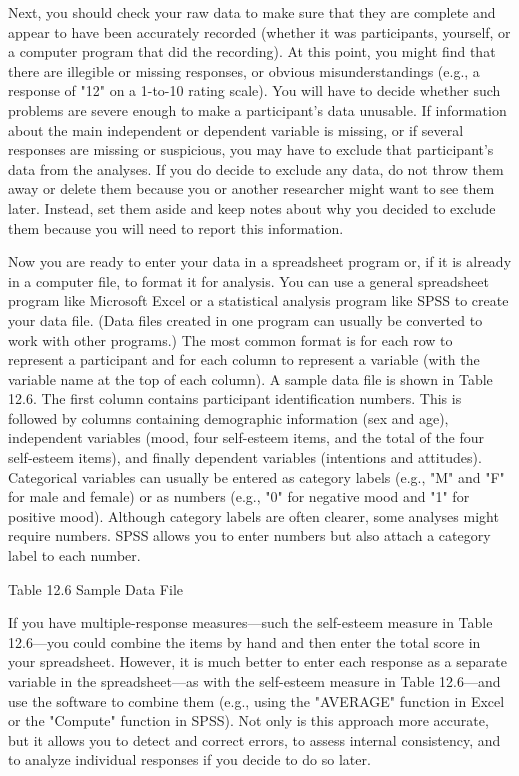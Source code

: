 Next, you should check your raw data to make sure that they are complete and appear to have been accurately recorded (whether it was participants, yourself, or a computer program that did the recording). At this point, you might find that there are illegible or missing responses, or obvious misunderstandings (e.g., a response of "12" on a 1-to-10 rating scale). You will have to decide whether such problems are severe enough to make a participant's data unusable. If information about the main independent or dependent variable is missing, or if several responses are missing or suspicious, you may have to exclude that participant's data from the analyses. If you do decide to exclude any data, do not throw them away or delete them because you or another researcher might want to see them later. Instead, set them aside and keep notes about why you decided to exclude them because you will need to report this information.

Now you are ready to enter your data in a spreadsheet program or, if it is already in a computer file, to format it for analysis. You can use a general spreadsheet program like Microsoft Excel or a statistical analysis program like SPSS to create your data file. (Data files created in one program can usually be converted to work with other programs.) The most common format is for each row to represent a participant and for each column to represent a variable (with the variable name at the top of each column). A sample data file is shown in Table 12.6. The first column contains participant identification numbers. This is followed by columns containing demographic information (sex and age), independent variables (mood, four self-esteem items, and the total of the four self-esteem items), and finally dependent variables (intentions and attitudes). Categorical variables can usually be entered as category labels (e.g., "M" and "F" for male and female) or as numbers (e.g., "0" for negative mood and "1" for positive mood). Although category labels are often clearer, some analyses might require numbers. SPSS allows you to enter numbers but also attach a category label to each number.

Table 12.6 Sample Data File

If you have multiple-response measures---such the self-esteem measure in Table 12.6---you could combine the items by hand and then enter the total score in your spreadsheet. However, it is much better to enter each response as a separate variable in the spreadsheet---as with the self-esteem measure in Table 12.6---and use the software to combine them (e.g., using the "AVERAGE" function in Excel or the "Compute" function in SPSS). Not only is this approach more accurate, but it allows you to detect and correct errors, to assess internal consistency, and to analyze individual responses if you decide to do so later.

